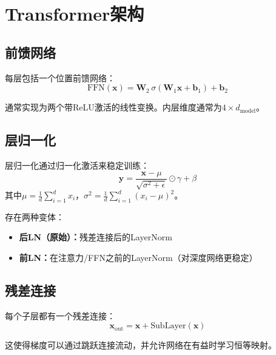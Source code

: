 \section{Transformer架构}

\subsection{前馈网络}

每层包括一个位置前馈网络：
\begin{equation}
\text{FFN}(\mathbf{x}) = \mathbf{W}_2 \, \sigma\left(\mathbf{W}_1 \mathbf{x} + \mathbf{b}_1\right) + \mathbf{b}_2
\end{equation}

通常实现为两个带ReLU激活的线性变换。内层维度通常为$4 \times d_{\text{model}}$。

\subsection{层归一化}

层归一化通过归一化激活来稳定训练：
\begin{equation}
\mathbf{y} = \frac{\mathbf{x} - \mu}{\sqrt{\sigma^2 + \epsilon}} \odot \gamma + \beta
\end{equation}
其中$\mu = \frac{1}{d}\sum_{i=1}^d x_i$，$\sigma^2 = \frac{1}{d}\sum_{i=1}^d (x_i - \mu)^2$。

存在两种变体：
\begin{itemize}
    \item \textbf{后LN（原始）：}残差连接后的LayerNorm
    \item \textbf{前LN：}在注意力/FFN之前的LayerNorm（对深度网络更稳定）
\end{itemize}

\subsection{残差连接}

每个子层都有一个残差连接：
\begin{equation}
\mathbf{x}_{\text{out}} = \mathbf{x} + \text{SubLayer}(\mathbf{x})
\end{equation}

这使得梯度可以通过跳跃连接流动，并允许网络在有益时学习恒等映射。

